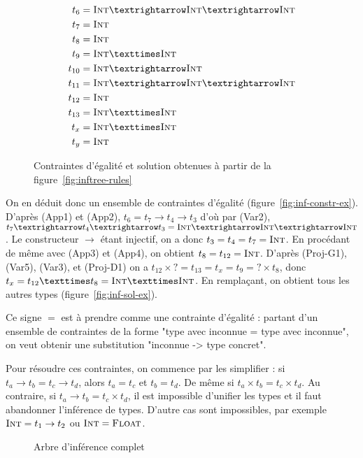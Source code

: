 \begin{figure}
{\begin{minipage}{0.3\linewidth}
\begin{align*}
  t_{6}  &= \tInt → \tInt → \tInt \\
  t_{7}  &= \tInt                 \\
  t_{8}  &= \tInt                 \\
  t_{9}  &= \tInt × \tInt         \\
  t_{10} &= \tInt → \tInt         \\
  t_{11} &= \tInt → \tInt → \tInt \\
  t_{12} &= \tInt                 \\
  t_{13} &= \tInt × \tInt         \\
  t_{x}  &= \tInt × \tInt         \\
  t_{y}  &= \tInt
  \end{align*}
  \end{minipage}
}

\caption{Contraintes d'égalité et solution obtenues à partir de la
figure~\ref{fig:inftree-rules}}

\end{figure}


On en déduit donc un ensemble de contraintes d'égalité
(figure~\ref{fig:inf-constr-ex}). D'après (App1) et (App2), $t_6 = t_7 → t_4 →
t_3$ d'où par (Var2), $t_7 → t_4 → t_3 = \tInt → \tInt → \tInt$. Le constructeur
$→$ étant injectif, on a donc $t_3 = t_4 = t_7 = \textsc{Int}$. En procédant de même
avec (App3) et (App4), on obtient $t_8 = t_{12} = \textsc{Int}$. D'après (Proj-G1),
(Var5), (Var3), et (Proj-D1) on a $t_{12} × ? = t_{13} = t_{x} = t_9 = ? ×
t_{8}$, donc $t_x = t_{12} × t_8 = \tInt × \tInt$. En remplaçant, on obtient
tous les autres types (figure~\ref{fig:inf-sol-ex}).


\clearpage

Ce signe $=$ est à prendre comme une contrainte d'égalité : partant d'un
ensemble de contraintes de la forme "type avec inconnue = type avec inconnue",
on veut obtenir une substitution "inconnue -> type concret".

Pour résoudre ces contraintes, on commence par les simplifier : si $t_a
\rightarrow t_b = t_c \rightarrow t_d$, alors $t_a = t_c$ et $t_b = t_d$. De
même si $t_a \times t_b = t_c \times t_d$. Au contraire, si $t_a \rightarrow t_b
= t_c \times t_d$, il est impossible d'unifier les types et il faut abandonner
l'inférence de types. D'autre cas sont impossibles, par exemple $\textsc{Int} = t_1
\rightarrow t_2$ ou $\textsc{Int} = \textsc{Float}$.

\begin{figure} %
\def\disptypeR#1#2{:#2}



\caption{Arbre d'inférence complet}
\label{fig:inftree-full}
\end{figure} %


